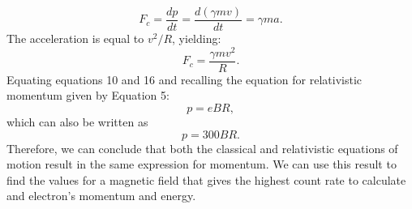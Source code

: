 \begin {equation} F_c=\frac{dp}{dt}=\frac{d(\gamma mv)}{dt}=\gamma ma. \end{equation}The acceleration is equal to $v^2/R$, yielding:
\begin{equation}F_c=\frac{\gamma mv^2}{R}.\end{equation} Equating equations 10 and 16 and  recalling the equation for relativistic momentum given by Equation 5:
\begin{equation}p=eBR,\end{equation} which can also be written as \begin{equation} p=300BR.\end{equation} Therefore, we can conclude that  both the classical and relativistic equations of motion result in the same expression for momentum. We can use this result to find the values for a magnetic field that gives the highest count rate to calculate and electron's momentum and energy. 

